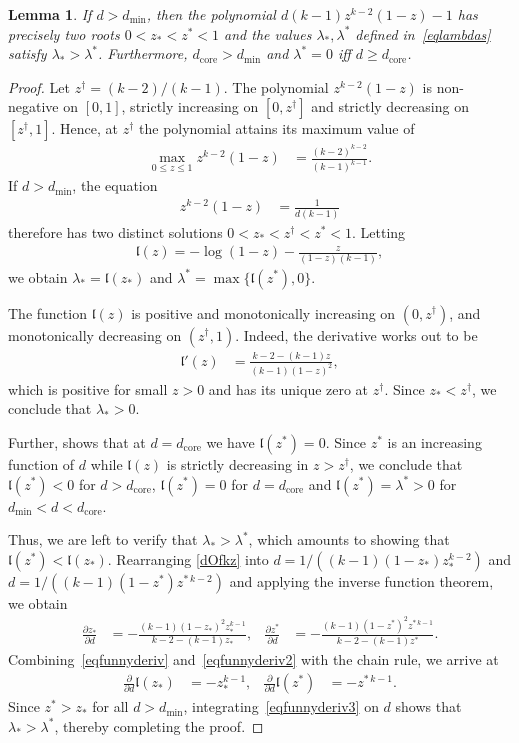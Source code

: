 \documentclass[10pt,reqno]{amsart}
\numberwithin{equation}{section}
\renewcommand{\ln}{\log}
\newcommand\dmin{d_{\mathrm{min}}}
\newcommand\dcore{d_{\mathrm{core}}}
\newcommand\fl{\mathfrak l}
\newcommand\Thm{Theorem}
\newtheorem{lemma}[definition]{Lemma}
\begin{document}
\begin{lemma}\label{lem_abovedmin}
	If $d>\dmin$, then the polynomial $d(k-1)z^{k-2}(1-z)-1$ has precisely two roots $0<z_*<z^*<1$ and the values $\lambda_*,\lambda^*$ defined in~\eqref{eqlambdas} satisfy $\lambda_*>\lambda^*$.
	Furthermore, $\dcore>\dmin$ and $\lambda^*=0$ iff $d\geq\dcore$.
\end{lemma}
\begin{proof}
	Let $z^\dagger=(k-2)/(k-1)$.
	The polynomial $z^{k-2}(1-z)$ is non-negative on $[0,1]$, strictly increasing on $[0,z^\dagger]$ and strictly decreasing on $[z^\dagger,1]$.
	Hence, at $z^\dagger$ the polynomial attains its maximum value of
	\begin{align}\label{eqmaxpoly}
		\max_{0\leq z\leq 1}z^{k-2}(1-z)&=\frac{(k-2)^{k-2}}{(k-1)^{k-1}}.
	\end{align}
	If $d>\dmin$, the equation 
	\begin{align} \label{dOfkz}
		z^{k-2}(1-z)&=\frac1{d(k-1)}
	\end{align}
	therefore has two distinct solutions $0<z_*<z^\dagger<z^*<1$.
	Letting
	\begin{align*}
		\fl(z)=-\ln(1-z)-\frac{z}{(1-z)(k-1)},
	\end{align*}
	we obtain $\lambda_*=\fl(z_*)$ and $\lambda^*=\max\{\fl(z^*),0\}$.

	The function $\fl(z)$ is positive and monotonically increasing on $(0,z^\dagger)$, and monotonically decreasing on $(z^\dagger,1)$.
	Indeed, the derivative works out to be
	\begin{align}\label{eqfunnyderiv}
		\fl'(z)&=\frac{k-2-(k-1)z}{(k-1)(1-z)^2},
	\end{align}
	which is positive for small $z>0$ and has its unique zero at $z^\dagger$.
	Since $z_*<z^\dagger$, we conclude that $\lambda_*>0$.

	Further, \cite[\Thm~1.2]{Maurice} shows that at $d=\dcore$ we have $\fl(z^*)=0$.
	Since $z^*$ is an increasing function of $d$ while $\fl(z)$ is strictly decreasing in $z>z^\dagger$, we conclude that $\fl(z^*)<0$ for $d>\dcore$, $\fl(z^*)=0$ for $d=\dcore$ and $\fl(z^*)=\lambda^*>0$ for $\dmin<d<\dcore$.

	Thus, we are left to verify that $\lambda_*>\lambda^*$, which amounts to showing that $\fl(z^*)<\fl(z_*)$.
	Rearranging \eqref{dOfkz} into $d=1/((k-1)(1-z_*)z_*^{k-2})$ and $d=1/((k-1)(1-z^*)z^{*\,k-2})$ and applying the inverse function theorem, we obtain
	\begin{align}\label{eqfunnyderiv2}
		\frac{\partial z_*}{\partial d}&=-\frac{(k-1)(1-z_*)^2z_*^{k-1}}{k-2-(k-1)z_*},&
		\frac{\partial z^*}{\partial d}&=-\frac{(k-1)(1-z^*)^2z^{*\,k-1}}{k-2-(k-1)z^*}.
	\end{align}
	Combining~\eqref{eqfunnyderiv} and~\eqref{eqfunnyderiv2} with the chain rule, we arrive at
	\begin{align}\label{eqfunnyderiv3}
		\frac\partial{\partial d}\fl(z_*)&=-z_*^{k-1},&	
		\frac\partial{\partial d}\fl(z^*)&=-z^{*\,k-1}.
	\end{align}
	Since $z^*>z_*$ for all $d>\dmin$, integrating~\eqref{eqfunnyderiv3} on $d$ shows that $\lambda_*>\lambda^*$, thereby completing the proof.
\end{proof}
\end{document}
